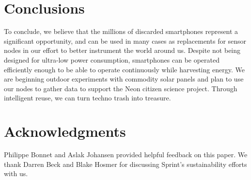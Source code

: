 \section{Conclusions}
\label{sec-conclusion}

To conclude, we believe that the millions of discarded smartphones represent
a significant opportunity, and can be used in many cases as replacements for
sensor nodes in our effort to better instrument the world around us. Despite
not being designed for ultra-low power consumption, smartphones can be
operated efficiently enough to be able to operate continuously while
harvesting energy. We are beginning outdoor experiments with commodity solar
panels and plan to use our nodes to gather data to support the Neon citizen
science project. Through intelligent reuse, we can turn techno trash into
treasure.

\section*{Acknowledgments}

Philippe Bonnet and Aslak Johansen provided helpful feedback on this paper.
We thank Darren Beck and Blake Hosmer for discussing Sprint's sustainability
efforts with us.
